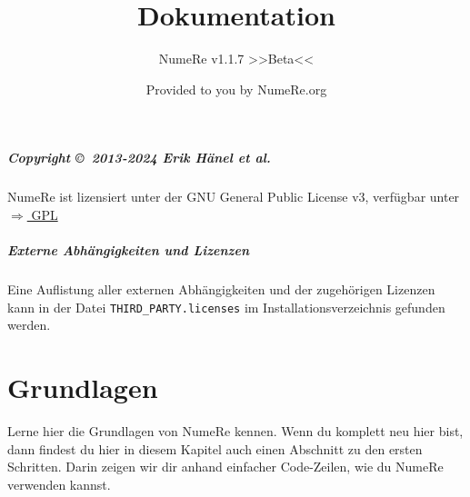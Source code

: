 \documentclass[DIV=17, parskip=half]{scrreprt}
\title{Dokumentation}
\subtitle{NumeRe v1.1.7 >>Beta<<}
\date{}
\author{\small Provided to you by NumeRe.org}
\begin{document}
    \maketitle
% 
% 
	\tableofcontents
		\paragraph{Copyright \copyright\ 2013-2024 Erik H\"anel \emph{et al.}} 
		NumeRe ist lizensiert unter der GNU General Public License v3, verf\"ugbar unter \href{http://www.gnu.org/licenses/gpl.html}{$\Rightarrow$ GPL}
		\paragraph{Externe Abh\"angigkeiten und Lizenzen} Eine Auflistung aller externen Abh\"angigkeiten und der zugeh\"origen Lizenzen kann in der Datei \verb!THIRD_PARTY.licenses! im Installationsverzeichnis gefunden werden.
	\chapter{Grundlagen}
		Lerne hier die Grundlagen von NumeRe kennen. Wenn du komplett neu hier bist, dann findest du hier in diesem Kapitel auch einen Abschnitt zu den ersten Schritten. Darin zeigen wir dir anhand einfacher Code-Zeilen, wie du NumeRe verwenden kannst.
		
		
		
		
		
		
		
		
		
		
	
\end{document}
